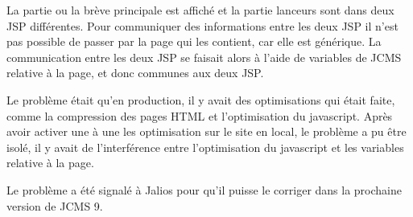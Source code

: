 \documentclass[12pt,a4paper]{article}
\begin{document}
La partie ou la brève principale est affiché et la partie lanceurs sont dans deux JSP différentes. Pour communiquer des informations entre les deux JSP il n'est pas possible de passer par la page qui les contient, car elle est générique. La communication entre les deux JSP se faisait alors à l'aide de variables de \gls{JCMS} relative à la page, et donc communes aux deux JSP.\par 
Le problème était qu'en production, il y avait des optimisations qui était faite, comme la compression des pages HTML et l'optimisation du javascript. Après avoir activer une à une les optimisation sur le site en local, le problème a pu être isolé, il y avait de l'interférence entre l'optimisation du javascript et les variables relative à la page.\par 
Le problème a été signalé à Jalios pour qu'il puisse le corriger dans la prochaine version de \gls{JCMS} 9.\par

\newpage
\end{document}
